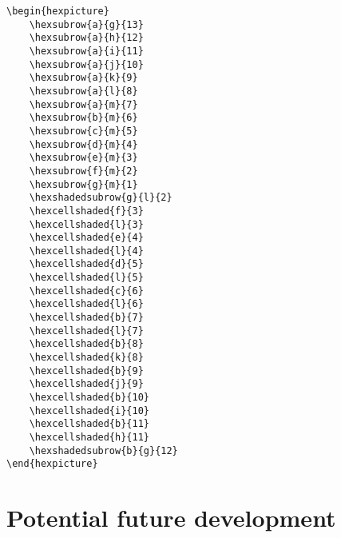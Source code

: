 \documentclass[a4paper,12pt]{article}
\begin{document}
    \begin{verbatim}\begin{hexpicture}
    \hexsubrow{a}{g}{13}
    \hexsubrow{a}{h}{12}
    \hexsubrow{a}{i}{11}
    \hexsubrow{a}{j}{10}
    \hexsubrow{a}{k}{9}
    \hexsubrow{a}{l}{8}
    \hexsubrow{a}{m}{7}
    \hexsubrow{b}{m}{6}
    \hexsubrow{c}{m}{5}
    \hexsubrow{d}{m}{4}
    \hexsubrow{e}{m}{3}
    \hexsubrow{f}{m}{2}
    \hexsubrow{g}{m}{1}
    \hexshadedsubrow{g}{l}{2}
    \hexcellshaded{f}{3}
    \hexcellshaded{l}{3}
    \hexcellshaded{e}{4}
    \hexcellshaded{l}{4}
    \hexcellshaded{d}{5}
    \hexcellshaded{l}{5}
    \hexcellshaded{c}{6}
    \hexcellshaded{l}{6}
    \hexcellshaded{b}{7}
    \hexcellshaded{l}{7}
    \hexcellshaded{b}{8}
    \hexcellshaded{k}{8}
    \hexcellshaded{b}{9}
    \hexcellshaded{j}{9}
    \hexcellshaded{b}{10}
    \hexcellshaded{i}{10}
    \hexcellshaded{b}{11}
    \hexcellshaded{h}{11}
    \hexshadedsubrow{b}{g}{12}
\end{hexpicture}\end{verbatim}
    
    \begin{hexpicture}
    \end{hexpicture}
    
    \section{Potential future development}
    
\end{document}
